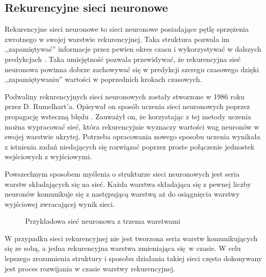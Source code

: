 \documentclass[10pt,a4paper]{article}
\begin{document}
\subsection{Rekurencyjne sieci neuronowe}
Rekurencyjne sieci neuronowe to sieci neuronowe posiadające pętlę sprzężenia zwrotnego w swojej warstwie rekurencyjnej. Taka struktura pozwala im ,,zapamiętywać'' informacje przez pewien okres czasu i wykorzystywać w dalszych predykcjach \cite{reviewOfANN2018}. Taka umiejętność pozwala przewidywać, że rekurencyjna sieć neuronowa powinna dobrze zachowywać się w predykcji szeregu czasowego dzięki ,,zapamiętywaniu'' wartości w poprzednich krokach czasowych. 

Podwaliny rekurencyjnych sieci neuronowych zostały stworzone w 1986 roku przez D. Rumelhart'a. Opisywał on sposób uczenia sieci neuronowych poprzez propagację wsteczną błędu \cite{rumelhart1986learning}. Zauważył on, że korzystając z tej metody uczenia można wypracować sieć, która rekurencyjnie wyznaczy wartości wag neuronów w swojej warstwie ukrytej. Potrzeba opracowania nowego sposobu uczenia wynikała z istnienia zadań niedających się rozwiązać poprzez proste połączenie jednostek wejściowych z wyjściowymi.

Powszechnym sposobem myślenia o strukturze sieci neuronowych jest seria warstw składających się na sieć. Każda warstwa składająca się z pewnej liczby neuronów komunikuje się z następującą warstwą aż do osiągnięcia warstwy wyjściowej zwracającej wynik sieci. 
\begin{figure}[!ht]
	\centering
	\caption{Przykładowa sieć neuronowa z trzema warstwami}
\end{figure}
\FloatBarrier

W przypadku sieci rekurencyjnej nie jest tworzona seria warstw komunikujących się ze sobą, a jedna rekurencyjna warstwa zmieniająca się w czasie. W celu lepszego zrozumienia struktury i sposobu działania takiej sieci często dokonywany jest proces rozwijania w czasie warstwy rekurencyjnej.
\end{document}

